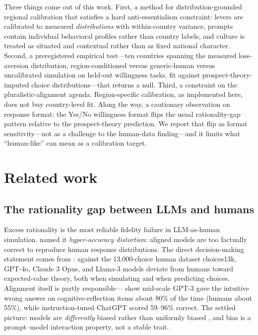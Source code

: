 \documentclass[10pt,letterpaper]{article}
\begin{document}
Three things come out of this work. First, a method for
distribution-grounded regional calibration that satisfies a hard
anti-essentialism constraint:
levers are calibrated to measured \textit{distributions} with
within-country variance, prompts contain individual behavioral profiles
rather than country labels, and culture is treated as situated and
contextual \citep{oyserman2008} rather than as fixed national character.
Second, a preregistered empirical test---ten countries spanning the
measured loss-aversion distribution, region-conditioned versus generic-human
versus uncalibrated simulation on held-out willingness tasks, fit against
prospect-theory-imputed choice distributions---that returns a null. Third, a constraint on the pluralistic-alignment agenda. Region-specific
calibration, as implemented here, does not buy country-level fit. Along the
way, a cautionary observation on response format: the Yes/No willingness
format flips the usual rationality-gap pattern relative to the
prospect-theory prediction. We report that flip as format
sensitivity---not as a challenge to the human-data finding---and it limits
what ``human-like'' can mean as a calibration target.

\section{Related work}

\subsection{The rationality gap between LLMs and humans}

Excess rationality is the most reliable fidelity failure in LLM-as-human
simulation. \citet{aher2023} named it \textit{hyper-accuracy distortion}:
aligned models are too factually correct to reproduce human response
distributions. The direct decision-making statement comes from
\citet{liu2025}: against the 13,000-choice human dataset choices13k,
GPT-4o, Claude 3 Opus, and Llama-3 models deviate from humans toward
expected-value theory, both when simulating and when predicting choices.
Alignment itself is partly responsible---\citet{hagendorff2023} show
mid-scale GPT-3 gave the intuitive wrong answer on cognitive-reflection
items about 80\% of the time (humans about 55\%), while instruction-tuned
ChatGPT scored 59--96\% correct. The settled picture: models are
\textit{differently} biased rather than uniformly biased
\citep{pagliaro2026,suri2024}, and bias is a prompt--model interaction
property, not a stable trait.
\end{document}
